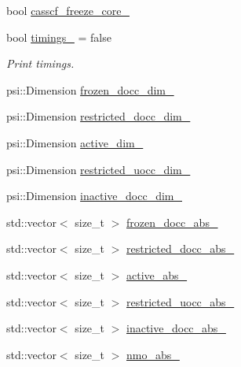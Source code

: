 \begin{DoxyCompactItemize}
bool \mbox{\hyperlink{classforte_1_1_orbital_optimizer_a41e43eada47dd7a103cb9439af387c7b}{casscf\+\_\+freeze\+\_\+core\+\_\+}}
\item 
bool \mbox{\hyperlink{classforte_1_1_orbital_optimizer_ada9eb662cf02e096436f137f622d70d7}{timings\+\_\+}} = false
\begin{DoxyCompactList}\small\item\em Print timings. \end{DoxyCompactList}\item 
psi\+::\+Dimension \mbox{\hyperlink{classforte_1_1_orbital_optimizer_a14b9be982c03f5e461643d321ba118c2}{frozen\+\_\+docc\+\_\+dim\+\_\+}}
\item 
psi\+::\+Dimension \mbox{\hyperlink{classforte_1_1_orbital_optimizer_aca488bd1292993ab8ca2852946ed21b7}{restricted\+\_\+docc\+\_\+dim\+\_\+}}
\item 
psi\+::\+Dimension \mbox{\hyperlink{classforte_1_1_orbital_optimizer_a2dfc66511a89851c4a37364854202c2e}{active\+\_\+dim\+\_\+}}
\item 
psi\+::\+Dimension \mbox{\hyperlink{classforte_1_1_orbital_optimizer_a6fc580ff9745c1b34ce10bb402577450}{restricted\+\_\+uocc\+\_\+dim\+\_\+}}
\item 
psi\+::\+Dimension \mbox{\hyperlink{classforte_1_1_orbital_optimizer_abc92eec0401d92847dcf26b4fb01fabd}{inactive\+\_\+docc\+\_\+dim\+\_\+}}
\item 
std\+::vector$<$ size\+\_\+t $>$ \mbox{\hyperlink{classforte_1_1_orbital_optimizer_a5ad02f9d3c927c488b753bbd8bd1ea78}{frozen\+\_\+docc\+\_\+abs\+\_\+}}
\item 
std\+::vector$<$ size\+\_\+t $>$ \mbox{\hyperlink{classforte_1_1_orbital_optimizer_af7dcd99d782ebfcaf5a84ed4a0cb8a55}{restricted\+\_\+docc\+\_\+abs\+\_\+}}
\item 
std\+::vector$<$ size\+\_\+t $>$ \mbox{\hyperlink{classforte_1_1_orbital_optimizer_a09ced43769a9cd379b3ec4a0cd5be430}{active\+\_\+abs\+\_\+}}
\item 
std\+::vector$<$ size\+\_\+t $>$ \mbox{\hyperlink{classforte_1_1_orbital_optimizer_a58194fef0fcc40972c6f9dff5bf71c0f}{restricted\+\_\+uocc\+\_\+abs\+\_\+}}
\item 
std\+::vector$<$ size\+\_\+t $>$ \mbox{\hyperlink{classforte_1_1_orbital_optimizer_a91d081aa8a5ca86e16eb69668a4a4a83}{inactive\+\_\+docc\+\_\+abs\+\_\+}}
\item 
std\+::vector$<$ size\+\_\+t $>$ \mbox{\hyperlink{classforte_1_1_orbital_optimizer_ac809975471748bca6e0ca2f11c0f2795}{nmo\+\_\+abs\+\_\+}}
\item 

\end{DoxyCompactItemize}
